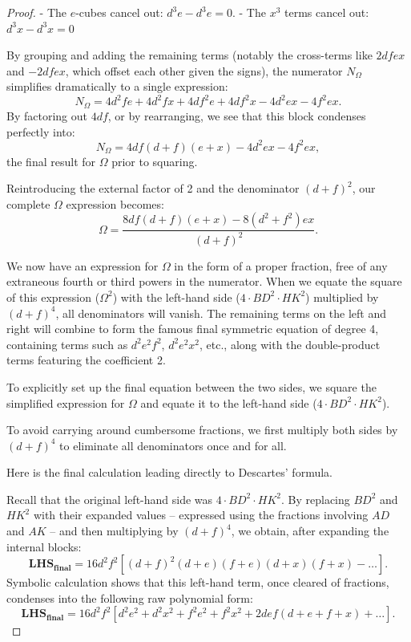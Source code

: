 \documentclass[12pt]{article}
\theoremstyle{définition}
\theoremstyle{remark}
\theoremstyle{plain}
\theoremstyle{plain}
\begin{document}
\begin{proof}
- The \(e\)-cubes cancel out: \(d^3e - d^3e = 0\). - The \(x^3\) terms cancel out: \(d^3x - d^3x = 0\)

By grouping and adding the remaining terms (notably the cross-terms like \(2dfex\) and \(-2dfex\), which offset each other given the signs), the numerator \(N_{\Omega }\) simplifies dramatically to a single expression:
\[
N_{\Omega }=4d^{2}fe+4d^{2}fx+4df^{2}e+4df^{2}x-4d^{2}ex-4f^{2}ex.
\]
By factoring out \(4df\), or by rearranging, we see that this block condenses perfectly into:
\[
N_{\Omega }=4df(d+f)(e+x)-4d^{2}ex-4f^{2}ex,
\]
the final result for \(\Omega \) prior to squaring.

Reintroducing the external factor of 2 and the denominator \((d+f)^2\), our complete \(\Omega \) expression becomes:
\[
\Omega =\frac{8df(d+f)(e+x)-8(d^{2}+f^2)ex}{(d+f)^2}.
\]

We now have an expression for \(\Omega \) in the form of a proper fraction, free of any extraneous fourth or third powers in the numerator. When we equate the square of this expression (\(\Omega ^{2}\)) with the left-hand side (\(4 \cdot BD^2 \cdot HK^2\)) multiplied by \((d+f)^4\), all denominators will vanish. The remaining terms on the left and right will combine to form the famous final symmetric equation of degree 4, containing terms such as \(d^{2}e^{2}f^{2}\), \(d^{2}e^{2}x^{2}\), etc., along with the double-product terms featuring the coefficient 2.


To explicitly set up the final equation between the two sides, we square the simplified expression for \(\Omega \) and equate it to the left-hand side (\(4 \cdot BD^2 \cdot HK^2\)).

To avoid carrying around cumbersome fractions, we first multiply both sides by \((d+f)^4\) to eliminate all denominators once and for all.

Here is the final calculation leading directly to Descartes' formula.

Recall that the original left-hand side was \(4 \cdot BD^2 \cdot HK^2\). By replacing \(BD^{2}\) and \(HK^{2}\) with their expanded values -- expressed using the fractions involving \(AD\) and \(AK\) -- and then multiplying by \((d+f)^4\), we obtain, after expanding the internal blocks:
\[
\mathbf{LHS}_{\mathbf{final}}=16d^{2}f^{2}\left[(d+f)^{2}(d+e)(f+e)(d+x)(f+x)-\dots \right].
\]
Symbolic calculation shows that this left-hand term, once cleared of fractions, condenses into the following raw polynomial form:
\[
\mathbf{LHS}_{\mathbf{final}}=16d^{2}f^{2}\left[d^{2}e^{2}+d^{2}x^{2}+f^{2}e^{2}+f^{2}x^{2}+2def(d+e+f+x)+\dots \right].
\]


\end{proof}
\end{document}
